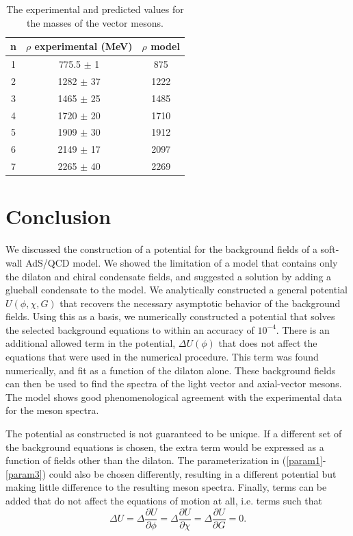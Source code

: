 \documentclass[aps,prd,12pt,nofootinbib]{revtex4}
\newcommand{\be}{\begin{equation}}
\newcommand{\ee}{\end{equation}}
\begin{document}
\begin{table}[htb]
\center
\begin{tabular}{| c || c | c  |}
\hline
n & $\rho$ experimental (MeV) & $\rho$ model \\
\hline
1 & 775.5 $\pm$  1 & 875	\\
2 & 1282 $\pm$ 37 & 1222 \\
3 & 1465 $\pm$ 25 & 1485 \\
4 &  1720 $\pm$ 20 & 1710 \\ 
5 &  1909 $\pm$ 30 & 1912 \\
6 &  2149 $\pm$  17& 2097 \\
7 &  2265 $\pm$  40& 2269 \\ 
\hline
\end{tabular}
\caption{The experimental and predicted values for the masses of the vector mesons.}
\label{tabRho}
\end{table}

\section{Conclusion}

We discussed the construction of a potential for the background fields of a soft-wall AdS/QCD model. 
We showed the limitation of a model that contains only the dilaton and chiral condensate fields, and suggested a solution by adding a glueball condensate to the model.
We analytically constructed a general potential $U(\phi,\chi,G)$ that recovers the necessary asymptotic behavior of the background fields.
Using this as a basis, we numerically constructed a potential that solves the selected background equations to within an accuracy of $10^{-4}$. 
There is an additional allowed term in the  potential, $\Delta U(\phi)$ that does not affect the equations that were used in the numerical procedure. 
This term was found numerically, and fit as a function of the dilaton alone.
These background fields can then be used to find the spectra of the light vector and axial-vector mesons.
The model shows good phenomenological agreement with the experimental data for the meson spectra.

The potential as constructed is not guaranteed to be unique.
If a different set of the background equations is chosen, the extra term would be expressed as a function of fields other than the dilaton.
The parameterization in (\ref{param1}-\ref{param3}) could also be chosen differently, resulting in a different potential but making little difference to the resulting meson spectra.
Finally, terms can be added that do not affect the equations of motion at all, i.e. terms such that 
\be
\Delta U = \Delta \frac{\partial U}{\partial \phi} = \Delta \frac{\partial U}{\partial \chi} = \Delta \frac{\partial U}{\partial G} =0.
\ee
\end{document}
